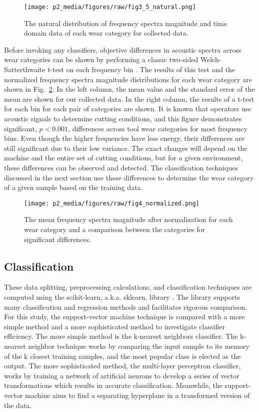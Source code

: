 \begin{figure}[t!]
\centering
\texttt{[image: p2\_media/figures/raw/fig3\_5\_natural.png]}
\caption{
The natural distribution of frequency spectra magnitude 
and time domain data of each wear category for collected data.
}
\label{fig:natural}
\end{figure}

Before invoking any classifiers, objective differences in acoustic spectra across wear 
categories can be shown by performing a classic two-sided Welch-Satterthwaite t-test on each frequency bin \cite{Tamhane2000}.
The results of this test and the normalized frequency spectra magnitude distributions
for each wear category are shown in Fig.~\ref{fig:sigs}.
In the left column, the mean value and the standard error of the mean are shown for our collected data.
In the right column, the results of a t-test for each bin for each pair of categories are shown.
It is known that operators use acoustic signals to determine cutting conditions,
and this figure demonstrates significant, $p < 0.001$, differences across tool wear categories
for most frequency bins. Even though the higher frequencies have less energy, their differences
are still significant due to their low variance.
The exact changes will depend on the machine and the entire set of cutting conditions, but 
for a given environment, these differences can be observed and detected.
The classification techniques discussed in the next section use these differences to 
determine the wear category of a given sample based on the training data.

\begin{figure}[t!]
\centering
\texttt{[image: p2\_media/figures/raw/fig4\_normalized.png]}
\caption{
The mean frequency spectra magnitude after normalization for each wear category and a 
comparison between the categories for significant differences.
}
\label{fig:sigs}
\end{figure}

\subsection{Classification}

These data splitting, preprocessing calculations, and classification techniques are 
computed using the scikit-learn, a.k.a. sklearn, library \cite{JMLR:v12:pedregosa11a}.
The library supports many classification and regression methods and facilitates rigorous comparison.
For this study, the support-vector machine technique is compared with a more simple method 
and a more sophisticated method to investigate classifier efficiency. 
The more simple method is the k-nearest neighbors classifier. 
The k-nearest neighbor technique works by comparing the input 
sample to its memory of the k closest training samples, and the most popular 
class is elected as the output. The more sophisticated method, 
the multi-layer perceptron classifier, works by training a network of artificial 
neurons to develop a series of vector transformations which results in accurate classification. 
Meanwhile, the support-vector machine aims to find a separating hyperplane in a transformed version of the data.

